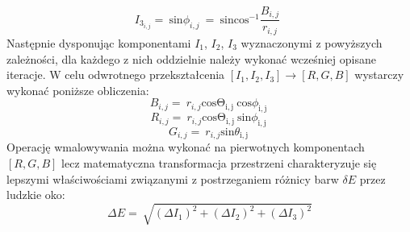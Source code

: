 \documentclass[12pt, twoside, openany]{report}
\theoremstyle{definition}
\begin{document}
\begin{equation}
I_{3_{i,j}}=\ {\mathrm{sin} {\phi }_{i,j}\ }=\ {\mathrm{sin} {{\mathrm{cos}}^{-1} \frac{B_{i,j}}{r_{i,j}}\ }\ } 
\label{TIthree}
\end{equation}
Następnie dysponując komponentami $I_1$, $I_2$, $I_3$ wyznaczonymi z powyższych zależności, dla każdego z nich oddzielnie należy wykonać wcześniej opisane iteracje. W celu odwrotnego przekształcenia $\left[I_1,I_2,I_3 \right]\to\left[R,G,B\right]$ wystarczy wykonać poniższe obliczenia:
\begin{equation}
 B_{i,j}=\ r_{i,j}{\mathrm{cos} {\mathrm{\Theta }}_{\mathrm{i,j}}\ }{\mathrm{cos} {\phi }_{\mathrm{i,j}}\ }
\label{TInvIone}
\end{equation}
\begin{equation}
R_{i,j}=\ r_{i,j}{\mathrm{cos} {\mathrm{\Theta }}_{\mathrm{i,j}}\ }{\mathrm{sin} {\phi }_{\mathrm{i,j}}\ }
\label{TInvItwo}
\end{equation}
\begin{equation}
G_{i,j}=\ r_{i,j}{\mathrm{sin} {\theta }_{\mathrm{i,j}}\ } 
\label{TInvIthree}
\end{equation}
Operację wmalowywania można wykonać na pierwotnych komponentach $[R,G,B]$ lecz matematyczna transformacja przestrzeni charakteryzuje się lepszymi właściwościami związanymi z postrzeganiem różnicy barw $\delta E$ przez ludzkie oko:
\begin{equation}
\Delta E=\ \sqrt{{\left(\Delta I_1\right)}^2+{\left(\Delta I_2\right)}^2+{\left(\Delta I_3\right)}^2}
\label{deltaE}
\end{equation}
\end{document}
